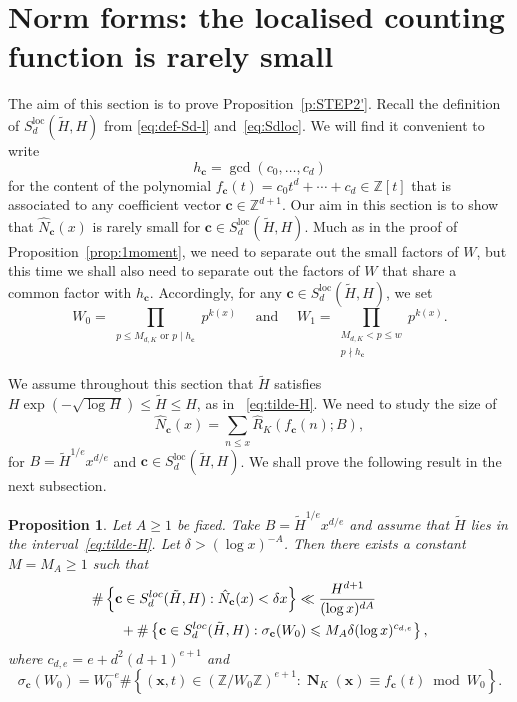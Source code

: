 \documentclass[11pt,letterpaper]{amsart}
\renewcommand{\leq}{\leqslant}
\renewcommand{\geq}{\geqslant}
\newtheorem{proposition}[theorem]{Proposition}
\theoremstyle{definition}
\numberwithin{equation}{section}
\newcommand\ZZ{\mathbb{Z}}
\newcommand{\x}{\mathbf{x}}
\renewcommand{\c}{\mathbf{c}}
\DeclareMathOperator{\nf}{\mathbf{N}}
\newcommand{\0}{\mathbf{0}}
\begin{document}
\section{Norm forms: the localised counting function is  rarely small}\label{sec:rarely-small}


The aim of this section is to prove 
Proposition~\ref{p:STEP2'}.
Recall the definition of 
$S_d^{\text{loc}}(\tilde H, H)$ from 
\eqref{eq:def-Sd-l} and~\eqref{eq:Sdloc}.
We will find it convenient to 
write
$$
h_\c=\gcd(c_0,\dots,c_d)
$$
for the content of the polynomial 
$f_\c(t)=c_0t^d+\cdots+c_d\in \ZZ[t]$ that is associated to any coefficient vector 
$\c\in \ZZ^{d+1}$.
Our aim in this section is to show that 
$\hat N_\c(x)$ is rarely small for 
$\c\in S_d^{\text{loc}}(\tilde H, H)$. Much as in the proof of Proposition~\ref{prop:1moment}, we need to separate out 
the small factors of $W$, but this time we shall also need to separate out the factors of $W$ that share a common factor with $h_\c$. Accordingly, for any $\c\in S_d^{\text{loc}}(\tilde H, H)$, we set
\begin{equation}\label{eq:WWW'}
W_0=\prod_{\substack{\text{$p\leq M_{d,K}$ or $p\mid h_\c$}}} p^{k(x)} \quad \text{ and } \quad 
W_1=\prod_{\substack{M_{d,K}<p\leq w \\ p\nmid h_\c}}p^{k(x)} .
\end{equation}

We assume throughout this section that  $\tilde H$ satisfies
$H \exp(-\sqrt{\log H})
\leq \tilde H \leq H$, as in ~\eqref{eq:tilde-H}.
We need to study the size of
$$
\hat N_\c(x)=\sum_{n\leq x} \hat R_K(f_\c(n);B),
$$
for
 $B=\tilde H^{1/e}x^{d/e}$ and  $\c\in 
   S_d^{\text{loc}}(\tilde H, H)$.
   We shall prove the  following result in  the next subsection. 


\begin{proposition}\label{p:STEP2}
Let $A\geq 1$ be fixed. Take $B=\tilde H^{1/e}x^{d/e}$ and assume that $\tilde H$ lies in the interval~\eqref{eq:tilde-H}.
Let $\delta>  (\log x)^{-A}$.
Then there exists a constant $M=M_A\geq 1$ such that
\begin{align*}
&\#\left\{ \c\in S_d^{\textnormal{loc}}(\tilde H, H): 
\hat N_\c(x) <\delta x\right\} 
 \ll \frac{H^{d+1}}{(\log x)^{dA}}\\
& \qquad +\#
\left\{ \c\in S_d^{\textnormal{loc}}(\tilde H, H):  \sigma_{\c}(W_0) \leq M_A
\delta (\log x)^{c_{d,e}}\right\},
\end{align*}
where $c_{d,e}=e+d^2(d+1)^{e+1}$ and 
\begin{equation}\label{eq:sig-c}
\sigma_\c(W_0)=W_0^{-e}\#\left\{
(\x,t)\in (\ZZ/W_0\ZZ)^{e+1}: \nf_K(\x)\equiv f_\c(t)\bmod{W_0}
\right\}.
\end{equation}
\end{proposition}
\end{document}
